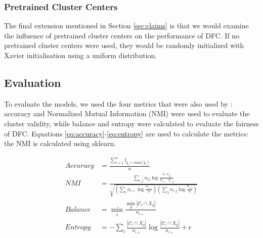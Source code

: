 
\subsubsection{Pretrained Cluster Centers}
The final extension mentioned in Section \ref{sec:claims} is that we would examine the influence of pretrained cluster centers on the performance of DFC. If no pretrained cluster centers were used, they would be randomly initialized with Xavier initialisation using a uniform distribution.


\subsection{Evaluation}


To evaluate the models, we used the four metrics that were also used by \citet{Li_2020_CVPR}: accuracy and Normalized Mutual Information (NMI) were used to evaluate the cluster validity, while balance and entropy were calculated to evaluate the fairness of DFC. Equations \ref{eq:accuracy}-\ref{eq:entropy} are used to calculate the metrics: the NMI is calculated using sklearn.

\begin{align}
    Accuracy &= \frac{\sum_{i=1}^n \mathbb{I}_{y_i=map(\hat{y}_i)}}{n}    
    \label{eq:accuracy}\\
    NMI &= \frac{\sum_{i,j} n_{ij}\log\frac{n\cdot n_{ij}}{n_{i+}\cdot n_{+j}}}{\sqrt{(\sum_i n_{i+}\log\frac{n_{i+}}{n}) (\sum_j n_{+j}\log\frac{n_{+j}}{n})}}
    \label{eq:NMI}\\
    Balance &= \min_i\frac{\min_g |\mathcal{C}_i\cap X_g|}{n_{i+}}    
    \label{eq:balance}\\
    Entropy &= -\sum_i \frac{|\mathcal{C}_i\cap X_g|}{n_{i+}}\log \frac{|\mathcal{C}_i\cap X_g|}{n_{i+}}+\epsilon
    \label{eq:entropy}
\end{align}


